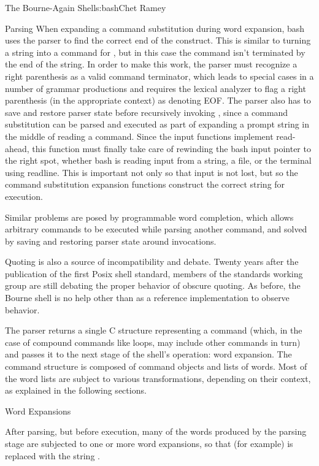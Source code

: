 \begin{aosachapter}{The Bourne-Again Shell}{s:bash}{Chet Ramey}
\begin{aosasect1}{Parsing}
When expanding a
command substitution during word expansion, bash uses the parser to
find the correct end of the construct.  This is similar to turning a
string into a command for , but in this
case the command isn't terminated by the end of the string.  In order
to make this work, the parser must recognize a right parenthesis as a
valid command terminator, which leads to special cases in a number of
grammar productions and requires the lexical analyzer to flag a right
parenthesis (in the appropriate context) as denoting EOF\@.  The parser
also has to save and restore parser state before recursively invoking
, since a command substitution can be parsed and
executed as part of expanding a prompt string in the middle of reading
a command.  Since the input functions implement read-ahead, this
function must finally take care of rewinding the bash input pointer to
the right spot, whether bash is reading input from a string, a file,
or the terminal using readline.  This is important not only so that
input is not lost, but so the command substitution expansion functions
construct the correct string for execution.

Similar problems are posed by programmable word completion, which allows
arbitrary commands to be executed while parsing another command,
and solved by saving and restoring parser state around invocations.

Quoting is also a source of incompatibility and debate.  Twenty years
after the publication of the first Posix shell standard, members of
the standards working group are still debating the proper behavior of
obscure quoting.  As before, the Bourne shell is no help other than as
a reference implementation to observe behavior.

The parser returns a single C structure representing a command (which,
in the case of compound commands like loops, may include other
commands in turn) and passes it to the next stage of the shell's
operation: word expansion.  The command structure is composed of
command objects and lists of words.  Most of the word lists are
subject to various transformations, depending on their context, as
explained in the following sections.

\end{aosasect1}

\begin{aosasect1}{Word Expansions}

After parsing, but before execution, many of the words produced by the
parsing stage are subjected to one or more word expansions, so that
(for example)  is replaced with the string
.


\end{aosasect1}
\end{aosachapter}
